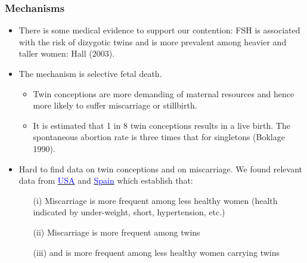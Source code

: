 \documentclass[10pt,letterpaper,subeqn]{beamer}
\begin{document}
\begin{frame}[label=mech]
\frametitle{Mechanisms}
\begin{itemize}

\item There is some medical evidence to support our contention: FSH is associated with the risk of dizygotic twins and is more prevalent among heavier and taller women: Hall (2003). \\ \vspace{3mm}
\item The mechanism is selective fetal death. 
\begin{itemize}
\item Twin conceptions are more demanding of maternal resources and hence more likely to suffer miscarriage or stillbirth.
\item It is estimated that 1 in 8 twin conceptions results in a live birth. The spontaneous abortion rate is three times that for singletons (Boklage 1990). \\ \vspace{3mm}
\end{itemize}
\item Hard to find data on twin conceptions and on miscarriage. We found relevant data from \hyperlink{TwinDeathNepal}{\textcolor{blue}{USA}} and \hyperlink{TwinDeathSpain}{\textcolor{blue}{Spain}} which establish that:
\begin{enumerate}
\item[(i)] Miscarriage is more frequent among less healthy women (health indicated by under-weight, short, hypertension, etc.)
\item[(ii)] Miscarriage is more frequent among twins
\item[(iii)] and is more frequent among less healthy women carrying twins
\end{enumerate}
\end{itemize}
\end{frame}





\end{document}
